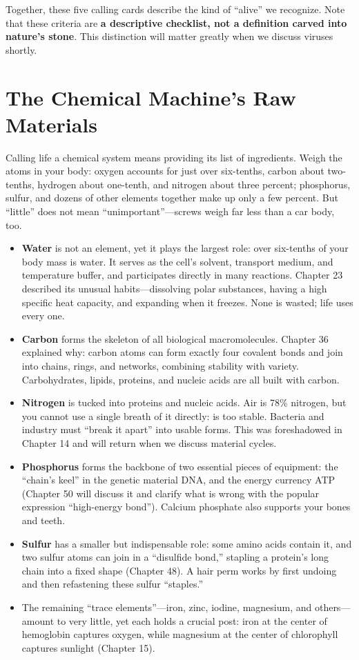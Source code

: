 Together, these five calling cards describe the kind of ``alive'' we recognize. Note that these criteria are \textbf{a descriptive checklist, not a definition carved into nature's stone}. This distinction will matter greatly when we discuss viruses shortly.

\section{The Chemical Machine's Raw Materials}

Calling life a chemical system means providing its list of ingredients. Weigh the atoms in your body: oxygen accounts for just over six-tenths, carbon about two-tenths, hydrogen about one-tenth, and nitrogen about three percent; phosphorus, sulfur, and dozens of other elements together make up only a few percent. But ``little'' does not mean ``unimportant''---screws weigh far less than a car body, too.

\begin{itemize}[itemsep=2pt]
\item \textbf{Water} is not an element, yet it plays the largest role: over six-tenths of your body mass is water. It serves as the cell's solvent, transport medium, and temperature buffer, and participates directly in many reactions. Chapter 23 described its unusual habits---dissolving polar substances, having a high specific heat capacity, and expanding when it freezes. None is wasted; life uses every one.
\item \textbf{Carbon} forms the skeleton of all biological macromolecules. Chapter 36 explained why: carbon atoms can form exactly four covalent bonds and join into chains, rings, and networks, combining stability with variety. Carbohydrates, lipids, proteins, and nucleic acids are all built with carbon.
\item \textbf{Nitrogen} is tucked into proteins and nucleic acids. Air is 78\% nitrogen, but you cannot use a single breath of it directly:  is too stable. Bacteria and industry must ``break it apart'' into usable forms. This was foreshadowed in Chapter 14 and will return when we discuss material cycles.
\item \textbf{Phosphorus} forms the backbone of two essential pieces of equipment: the ``chain's keel'' in the genetic material DNA, and the energy currency ATP (Chapter 50 will discuss it and clarify what is wrong with the popular expression ``high-energy bond''). Calcium phosphate also supports your bones and teeth.
\item \textbf{Sulfur} has a smaller but indispensable role: some amino acids contain it, and two sulfur atoms can join in a ``disulfide bond,'' stapling a protein's long chain into a fixed shape (Chapter 48). A hair perm works by first undoing and then refastening these sulfur ``staples.''
\item The remaining ``trace elements''---iron, zinc, iodine, magnesium, and others---amount to very little, yet each holds a crucial post: iron at the center of hemoglobin captures oxygen, while magnesium at the center of chlorophyll captures sunlight (Chapter 15).
\end{itemize}

